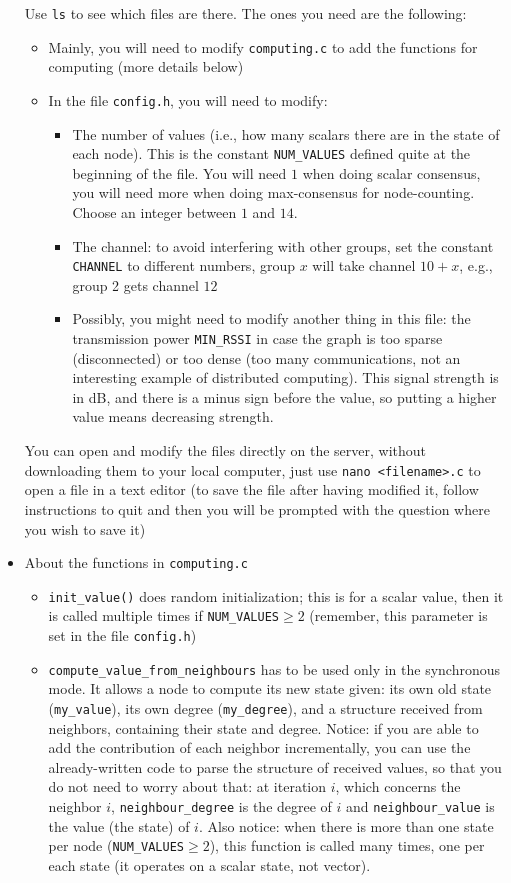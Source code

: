 \documentclass{article}
\begin{document}
\begin{itemize}
Use \verb=ls= to see which files are there. The ones you need are the following:
	\begin{itemize}
	\item Mainly, you will need to modify \verb=computing.c= to add the functions for computing (more details below)
	\item In the file \verb=config.h=, you will need to modify:
		\begin{itemize}
		\item The number of values (i.e., how many scalars there are in the state of each node). This is the constant \verb=NUM_VALUES= defined quite at the beginning of the file. You will need $1$ when doing scalar consensus, you will need more when doing max-consensus for node-counting. Choose an integer between $1$ and $14$.
		\item The channel: to avoid interfering with other groups, set the constant \verb=CHANNEL= to different numbers, group $x$ will take channel $10+x$, e.g., group 2 gets channel $12$
		\item Possibly, you might  need to modify another thing in this file: the transmission power \verb=MIN_RSSI= in case the graph is too sparse (disconnected) or too dense (too many communications, not an interesting example of distributed computing). This signal strength is in dB, and there is a minus sign before the value, so putting a higher value means decreasing strength.
		\end{itemize}
	\end{itemize}
You can open and modify the files directly on the server, without downloading them to your local computer, just use \verb=nano <filename>.c= to open a file in a text editor (to save the file after having modified it, follow instructions to quit and then you will be prompted with the question where you wish to save it)
\item About the functions in \verb=computing.c=
	\begin{itemize}
	\item  \verb=init_value()= does random initialization; this is for a scalar value, then it is called multiple times if \verb=NUM_VALUES=$\ge 2$ (remember, this parameter is set in the file \verb=config.h=)
	\item \verb=compute_value_from_neighbours= has to be used only in the synchronous mode. It allows a node to compute its new state given: its own old state (\verb=my_value=), its own degree (\verb=my_degree=), and a structure received from neighbors, containing their state and degree. Notice: if you are able to add the contribution of each neighbor incrementally, you can use the already-written code to parse the structure of received values, so that you do not need to worry about that: at iteration $i$, which concerns the neighbor $i$, \verb=neighbour_degree= is the degree of $i$ and \verb=neighbour_value= is the value (the state) of $i$. Also notice: when there is more than one state per node (\verb=NUM_VALUES=$\ge 2$), this function is called many times, one per each state (it operates on a scalar state, not vector).

\end{itemize}
\end{itemize}
\end{document}
